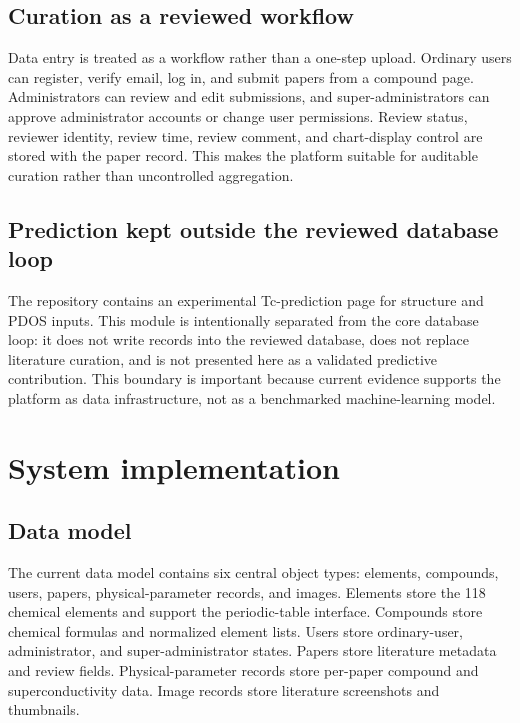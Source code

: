 \documentclass[11pt,a4paper]{article}
\begin{document}
\subsection{Curation as a reviewed workflow}

Data entry is treated as a workflow rather than a one-step upload. Ordinary users can register, verify email, log in, and submit papers from a compound page. Administrators can review and edit submissions, and super-administrators can approve administrator accounts or change user permissions. Review status, reviewer identity, review time, review comment, and chart-display control are stored with the paper record. This makes the platform suitable for auditable curation rather than uncontrolled aggregation.

\subsection{Prediction kept outside the reviewed database loop}

The repository contains an experimental Tc-prediction page for structure and PDOS inputs. This module is intentionally separated from the core database loop: it does not write records into the reviewed database, does not replace literature curation, and is not presented here as a validated predictive contribution. This boundary is important because current evidence supports the platform as data infrastructure, not as a benchmarked machine-learning model.

\section{System implementation}

\subsection{Data model}

The current data model contains six central object types: elements, compounds, users, papers, physical-parameter records, and images. Elements store the 118 chemical elements and support the periodic-table interface. Compounds store chemical formulas and normalized element lists. Users store ordinary-user, administrator, and super-administrator states. Papers store literature metadata and review fields. Physical-parameter records store per-paper compound and superconductivity data. Image records store literature screenshots and thumbnails.
\end{document}

